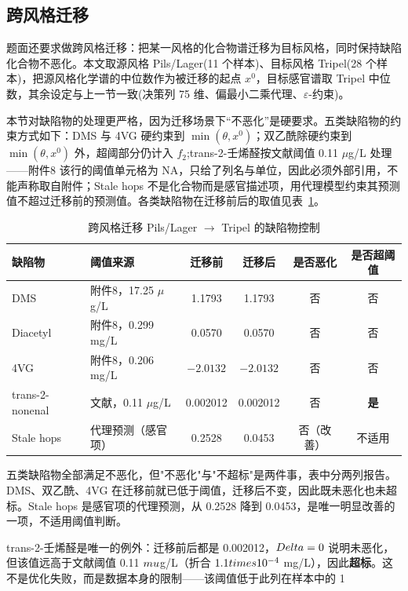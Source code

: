 \subsection{跨风格迁移}

题面还要求做跨风格迁移：把某一风格的化合物谱迁移为目标风格，同时保持缺陷化合物不恶化。本文取源风格 Pils/Lager(11 个样本)、目标风格 Tripel(28 个样本)，把源风格化学谱的中位数作为被迁移的起点 $x^0$，目标感官谱取 Tripel 中位数，其余设定与上一节一致(决策列 75 维、偏最小二乘代理、$\varepsilon$-约束)。

本节对缺陷物的处理更严格，因为迁移场景下“不恶化”是硬要求。五类缺陷物的约束方式如下：DMS 与 4VG 硬约束到 $\min(\theta,x^0)$；双乙酰除硬约束到 $\min(\theta,x^0)$ 外，超阈部分仍计入 $f_2$;trans-2-壬烯醛按文献阈值 0.11 $\mu$g/L 处理——附件8 该行的阈值单元格为 NA，只给了列名与单位，因此必须外部引用，不能声称取自附件；Stale hops 不是化合物而是感官描述项，用代理模型约束其预测值不超过迁移前的预测值。各类缺陷物在迁移前后的取值见表~\ref{tab:q3transfer}。

\begin{table}[htbp]
\centering
\footnotesize
\caption{跨风格迁移 Pils/Lager $\to$ Tripel 的缺陷物控制}
\label{tab:q3transfer}
\begin{tabular*}{\textwidth}{@{\extracolsep{\fill}}llcccc@{}}
\toprule
\textbf{缺陷物} & \textbf{阈值来源} & \textbf{迁移前} & \textbf{迁移后} & \textbf{是否恶化} & \textbf{是否超阈值} \\
\midrule
DMS & 附件8，17.25 $\mu$g/L & 1.1793 & 1.1793 & 否 & 否 \\
Diacetyl & 附件8，0.299 mg/L & 0.0570 & 0.0570 & 否 & 否 \\
4VG & 附件8，0.206 mg/L & $-2.0132$ & $-2.0132$ & 否 & 否 \\
trans-2-nonenal & 文献，0.11 $\mu$g/L & 0.002012 & 0.002012 & 否 & \textbf{是} \\
Stale hops & 代理预测（感官项） & 0.2528 & 0.0453 & 否（改善） & 不适用 \\
\bottomrule
\end{tabular*}
\end{table}

五类缺陷物全部满足不恶化，但"不恶化"与"不超标"是两件事，表中分两列报告。DMS、双乙酰、4VG 在迁移前就已低于阈值，迁移后不变，因此既未恶化也未超标。Stale hops 是感官项的代理预测，从 0.2528 降到 0.0453，是唯一明显改善的一项，不适用阈值判断。

trans-2-壬烯醛是唯一的例外：迁移前后都是 0.002012，$\\Delta=0$ 说明未恶化，但该值远高于文献阈值 0.11 $\\mu$g/L（折合 $1.1\\times10^{-4}$ mg/L），因此\textbf{超标}。这不是优化失败，而是数据本身的限制——该阈值低于此列在样本中的 1\\%

